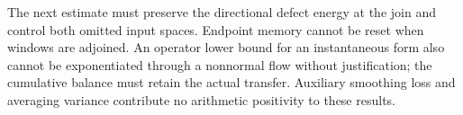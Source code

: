 The next estimate must preserve the directional defect energy
at the join and control both omitted input spaces. Endpoint memory
cannot be reset when windows are adjoined. An operator lower bound
for an instantaneous form also cannot be exponentiated through a
nonnormal flow without justification; the cumulative balance must
retain the actual transfer. Auxiliary smoothing loss and averaging
variance contribute no arithmetic positivity to these results.

